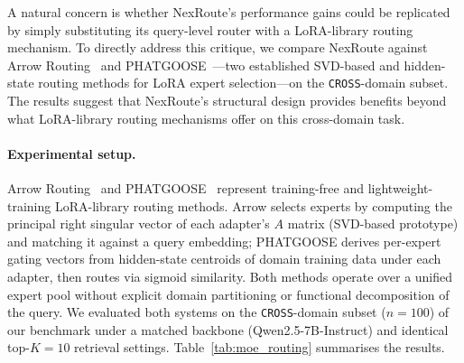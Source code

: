 \documentclass[a4paper,fleql]{cas-sc}
\begin{document}
A natural concern is whether NexRoute's performance gains could be replicated
by simply substituting its query-level router with a LoRA-library routing
mechanism. To directly address this critique, we
compare NexRoute against Arrow Routing~\citep{arrow2024routing} and
PHATGOOSE~\citep{muqeeth2024phatgoose}---two established SVD-based and
hidden-state routing methods for LoRA expert selection---on the \texttt{CROSS}-domain subset.
The results suggest that NexRoute's structural design provides benefits
beyond what LoRA-library routing mechanisms offer on this cross-domain task.

\paragraph{Experimental setup.}
Arrow Routing~\citep{arrow2024routing} and PHATGOOSE~\citep{muqeeth2024phatgoose}
represent training-free and lightweight-training LoRA-library routing methods.
Arrow selects experts by computing the principal right singular vector of each
adapter's $A$ matrix (SVD-based prototype) and matching it against a query
embedding; PHATGOOSE derives per-expert gating vectors from hidden-state
centroids of domain training data under each adapter, then routes via
sigmoid similarity. Both methods
operate over a unified expert pool without explicit domain partitioning or functional
decomposition of the query. We evaluated both systems on the \texttt{CROSS}-domain
subset ($n{=}100$) of our benchmark under a matched backbone
(Qwen2.5-7B-Instruct) and identical top-$K{=}10$ retrieval settings.
Table~\ref{tab:moe_routing} summarises the results.
\end{document}
